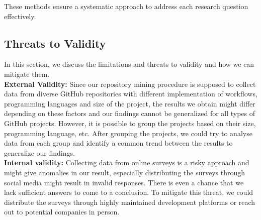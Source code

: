 \documentclass[conference]{IEEEtran}
\begin{document}
    These methods ensure a systematic approach to address each research question effectively.\\



\subsection{Threats to Validity}
    In this section, we discuss the limitations and threats to
    validity and how we can mitigate them.\\

    \textbf{External Validity:} Since our repository mining procedure is supposed to collect data from diverse GitHub repositories with different implementation of workflows, programming languages and size of the project, the results we obtain might differ depending on these factors and our findings cannot be generalized for all types of GitHub projects. However, it is possible to group the projects based on their size, programming language, etc. After grouping the projects, we could try to analyse data from each group and identify a common trend between the results to generalize our findings.\\

    \textbf{Internal validity:} Collecting data from online surveys is a risky approach and might give anomalies in our result, especially distributing the surveys through social media might result in invalid responses. There is even a chance that we lack sufficient answers to come to a conclusion. To mitigate this threat, we could distribute the surveys through highly maintained development platforms or reach out to potential companies in person. 






\vspace{12pt}
\end{document}
